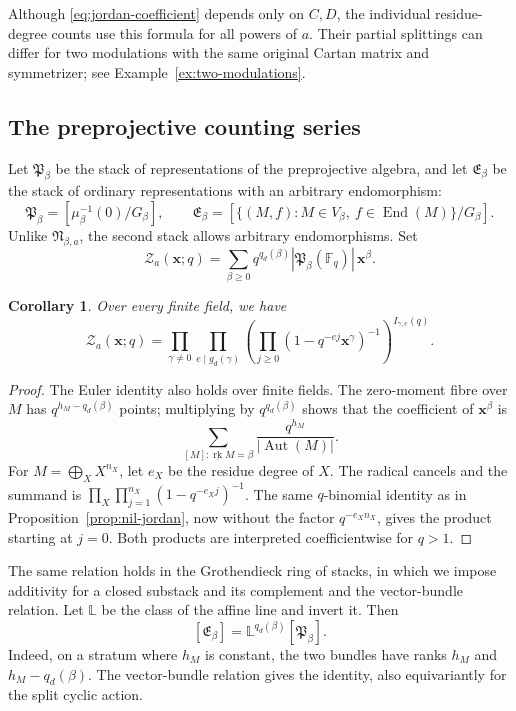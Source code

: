 \documentclass[11pt, reqno]{amsart}
\numberwithin{equation}{section}
\newtheorem{corollary}[theorem]{Corollary}
\theoremstyle{definition}
\theoremstyle{remark}
\newcommand{\op}[1]{\operatorname{#1}}
\newcommand{\mb}[1]{\mathbb{#1}}
\newcommand{\mc}[1]{\mathcal{#1}}
\newcommand{\rk}{\underline{\op{rk}}}
\newcommand{\End}{\op{End}}
\newcommand{\Aut}{\op{Aut}}
\begin{document}
Although \eqref{eq:jordan-coefficient} depends only on $C,D$, the
individual residue-degree counts use this formula for all powers of
$a$. Their partial splittings can differ for two modulations with the
same original Cartan matrix and symmetrizer; see
Example~\ref{ex:two-modulations}.


\subsection{The preprojective counting series}
Let $\mathfrak P_\beta$ be the stack of representations of the
preprojective algebra, and let $\mathfrak E_\beta$ be the stack of
ordinary representations with an arbitrary endomorphism:
\[ \mathfrak P_\beta=[\mu_\beta^{-1}(0)/G_\beta],\qquad \mathfrak E_\beta= [\{(M,f):M\in V_\beta,\ f\in\End(M)\}/G_\beta]. \]
Unlike $\mathfrak N_{\beta,a}$, the second stack allows arbitrary
endomorphisms. Set
\[ \mc Z_a(\mathbf x;q)=\sum_{\beta\ge0} q^{q_d(\beta)}|\mathfrak P_\beta(\mb F_q)|\,\mathbf x^\beta. \]
\begin{corollary}\label{cor:mass-product}
Over every finite field, we have
\[ \mc Z_a(\mathbf x;q)= \prod_{\gamma\ne0}\prod_{e\mid g_d(\gamma)} \left(\prod_{j\ge0}(1-q^{-ej}\mathbf x^\gamma)^{-1}\right)^{I_{\gamma,e}(q)}. \]
\end{corollary}
\begin{proof}
The Euler identity also holds over finite fields. The zero-moment
fibre over $M$ has $q^{h_M-q_d(\beta)}$ points; multiplying by
$q^{q_d(\beta)}$ shows that the coefficient of $\mathbf x^\beta$ is
\[ \sum_{[M]:\rk M=\beta}\frac{q^{h_M}}{|\Aut(M)|}. \]
For $M=\bigoplus_X X^{n_X}$, let $e_X$ be the residue degree of $X$.
The radical cancels and the summand is
$\prod_X\prod_{j=1}^{n_X}(1-q^{-e_Xj})^{-1}$.
The same $q$-binomial identity as in Proposition~\ref{prop:nil-jordan},
now without the factor $q^{-e_Xn_X}$, gives the product starting at
$j=0$. Both products are interpreted coefficientwise for $q>1$.
\end{proof}
The same relation holds in the Grothendieck ring of stacks, in which
we impose additivity for a closed substack and its complement and the
vector-bundle relation. Let $\mb L$ be the class of the affine
line and invert it. Then
\[ [\mathfrak E_\beta]=\mb L^{q_d(\beta)}[\mathfrak P_\beta]. \]
Indeed, on a stratum where $h_M$ is constant, the two bundles have
ranks $h_M$ and $h_M-q_d(\beta)$.
The vector-bundle relation gives the identity,
also equivariantly for the split cyclic action.
\end{document}
